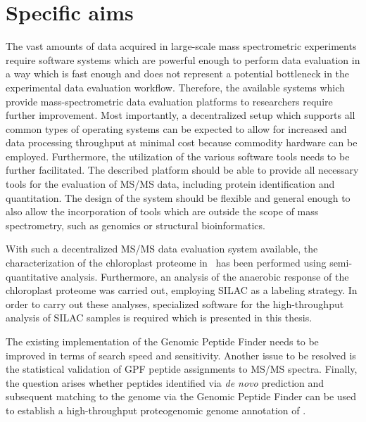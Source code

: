 \cleardoublepage
\chapter{Specific aims}

The vast amounts of data acquired in large-scale mass spectrometric experiments
require software systems which are powerful enough to perform data evaluation
in a way which is fast enough and does not represent a potential bottleneck in 
the experimental data evaluation workflow.
Therefore, the available systems which provide mass-spectrometric data 
evaluation platforms to researchers require further improvement.
Most importantly, a decentralized setup which supports all common types of 
operating systems can be expected to allow for increased and data processing 
throughput at minimal cost because commodity hardware can be employed.
Furthermore, the utilization of the various software tools needs to be further 
facilitated.
The described platform should be able to provide all necessary tools for
the evaluation of MS/MS data, including protein identification and quantitation.
The design of the system should be flexible and general enough to also
allow the incorporation of tools which are outside the scope of mass 
spectrometry, such as genomics or structural bioinformatics.

With such a decentralized MS/MS data evaluation system available, the
characterization of the chloroplast proteome in \cre~has been performed using
semi-quantitative analysis.
Furthermore, an analysis of the anaerobic response of the chloroplast proteome
was carried out, employing SILAC as a labeling strategy.
In order to carry out these analyses, specialized software for the 
high-throughput analysis of SILAC samples is required which is presented 
in this thesis.

The existing implementation of the Genomic Peptide Finder needs to
be improved in terms of search speed and sensitivity.
Another issue to be resolved is the statistical validation of GPF peptide 
assignments to MS/MS spectra.
Finally, the question arises whether peptides identified via {\em de novo} 
prediction and subsequent matching to the genome via the Genomic Peptide Finder 
can be used to establish a high-throughput proteogenomic genome annotation 
of \cre.
